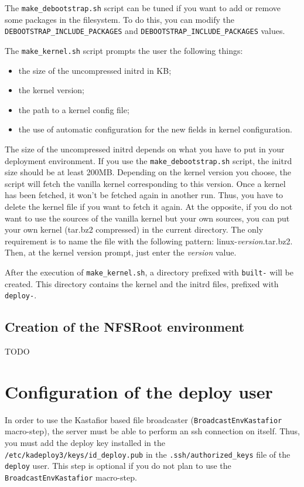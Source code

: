 \documentclass[a4wide,10pt,oneside]{book}
\begin{document}
The \texttt{make\_debootstrap.sh} script can be tuned if you want to add or remove some packages in the filesystem. To do this, you can modify the \texttt{DEBOOTSTRAP\_INCLUDE\_PACKAGES} and \texttt{DEBOOTSTRAP\_INCLUDE\_PACKAGES} values.

The \texttt{make\_kernel.sh} script prompts the user the following things:
\begin{itemize}
\item the size of the uncompressed initrd in KB;
\item the kernel version;
\item the path to a kernel config file;
\item the use of automatic configuration for the new fields in kernel configuration.
\end{itemize}

The size of the uncompressed initrd depends on what you have to put in your deployment environment. If you use the \texttt{make\_debootstrap.sh} script, the initrd size should be at least 200MB.
Depending on the kernel version you choose, the script will fetch the vanilla kernel corresponding to this version. Once a kernel has been fetched, it won't be fetched again in another run. Thus, you have to delete the kernel file if you want to fetch it again. At the opposite, if you do not want to use the sources of the vanilla kernel but your own sources, you can put your own kernel (tar.bz2 compressed) in the current directory. The only requirement is to name the file with the following pattern: linux-\textit{version}.tar.bz2. Then, at the kernel version prompt, just enter the \textit{version} value.

After the execution of \texttt{make\_kernel.sh}, a directory prefixed with \texttt{built-} will be created. This directory contains the kernel and the initrd files, prefixed with \texttt{deploy-}.

\subsection{Creation of the NFSRoot environment}
TODO

\section{Configuration of the deploy user}
In order to use the Kastafior based file broadcaster (\texttt{BroadcastEnvKastafior} macro-step), the server must be able to perform an ssh connection on itself. Thus, you must add the deploy key installed in the \texttt{/etc/kadeploy3/keys/id\_deploy.pub} in the \texttt{.ssh/authorized\_keys} file of the \texttt{deploy} user. This step is optional if you do not plan to use the \texttt{BroadcastEnvKastafior} macro-step.
\end{document}
